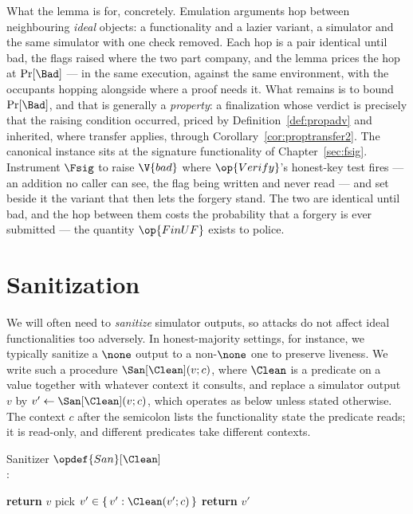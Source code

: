 \documentclass[10pt,oneside,openany]{book}
\theoremstyle{accentdef}
\theoremstyle{accentplain}
\begin{document}
What the lemma is for, concretely. Emulation arguments hop between neighbouring \emph{ideal}
objects: a functionality and a lazier variant, a simulator and the same simulator with one check
removed. Each hop is a pair identical until bad, the flags raised where the two part company,
and the lemma prices the hop at $\Pr[\Bad]$ --- in the same execution, against the same
environment, with the occupants hopping alongside where a proof needs it. What remains is to
bound $\Pr[\Bad]$, and that is generally a \emph{property}: a finalization whose verdict is
precisely that the raising condition occurred, priced by Definition~\ref{def:propadv} and
inherited, where transfer applies, through Corollary~\ref{cor:proptransfer2}. The canonical
instance sits at the signature functionality of Chapter~\ref{sec:fsig}. Instrument $\Fsig$ to
raise $\V{bad}$ where $\op{Verify}$'s honest-key test fires --- an addition no caller can see,
the flag being written and never read --- and set beside it the variant that then lets the
forgery stand. The two are identical until bad, and the hop between them costs the probability
that a forgery is ever submitted --- the quantity $\op{FinUF}$ exists to police.

\chapter{Sanitization}\label{sec:sanitization}

We will often need to \emph{sanitize} simulator outputs, so attacks do not affect ideal
functionalities too adversely. In honest-majority settings, for instance, we typically sanitize a
$\none$ output to a non-$\none$ one to preserve liveness. We write such a procedure
$\San[\Clean](v; c)$, where $\Clean$ is a predicate on a value together with whatever context it
consults, and replace a simulator output $v$ by $v' \gets \San[\Clean](v; c)$, which operates as
below unless stated otherwise. The context $c$ after the semicolon lists the functionality state
the predicate reads; it is read-only, and different predicates take different contexts.

\begin{procedure}{Sanitizer $\opdef{San}[\Clean]$ \\
}
:
\begin{algorithmic}[1]
  \State \textbf{return} $v$
\EndIf
\State pick $v' \in \{\, v' : \Clean(v'; c) \,\}$ \label{ln:sanpick}
\State \textbf{return} $v'$
\end{algorithmic}
\end{procedure}
\end{document}
